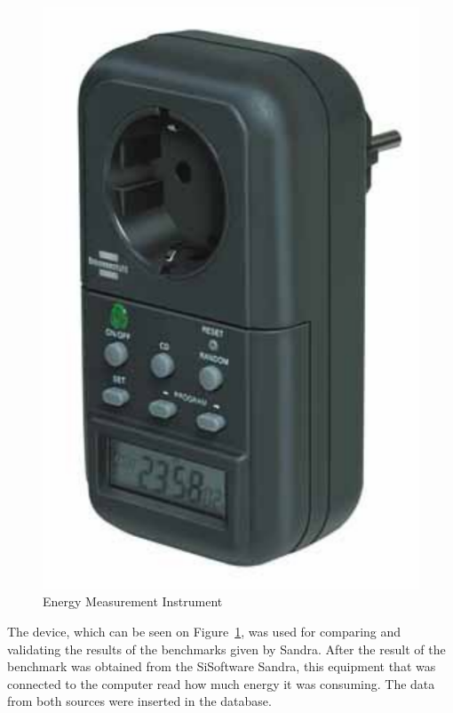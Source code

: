         \begin{figure}[htbp]
            \centering
                \includegraphics[scale=0.6]{graphics/energy_measurement_instrument}
                \caption{Energy Measurement Instrument}
                \label{fig:energy_measurement_instrument}
        \end{figure}
        The device, which can be seen on Figure~\ref{fig:energy_measurement_instrument}, was used for comparing and validating the results of the benchmarks given by Sandra. After the result of the benchmark was obtained from the SiSoftware Sandra, this equipment that was connected to the computer read how much energy it was consuming. The data from both sources were inserted in the database.
        
